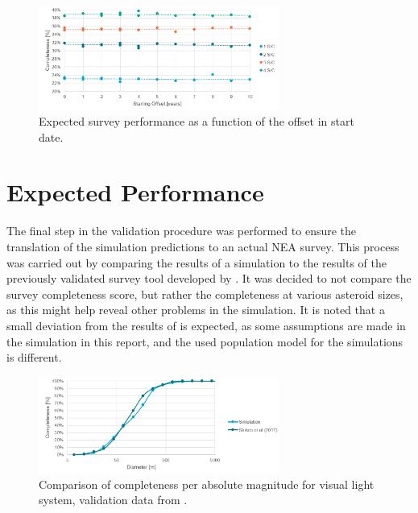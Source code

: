 \begin{figure}[htbp]
 \centering
 \includegraphics[width=0.7\textwidth]{img/validation_starting_year.png}
 \caption{Expected survey performance as a function of the offset in start date.}
 \label{fig:validation_starting_year}
\end{figure}



\section{Expected Performance}
\label{sec:vvperformance}

The final step in the validation procedure was performed to ensure the translation of the simulation predictions to an actual NEA survey. This process was carried out by comparing the results of a simulation to the results of the previously validated survey tool developed by \cite{2017NEOSDT}. It was decided to not compare the survey completeness score, but rather the completeness at various asteroid sizes, as this might help reveal other problems in the simulation. It is noted that a small deviation from the results of \cite{2017NEOSDT} is expected, as some assumptions are made in the simulation in this report, and the used population model for the simulations is different.

\begin{figure}[htbp]
 \centering
 \includegraphics[width=0.7\textwidth]{img/validation_completeness_vis.png}
 \caption{Comparison of completeness per absolute magnitude for visual light system, validation data from \cite{2017NEOSDT}.}
 \label{fig:validation_completeness_vis}
\end{figure}


